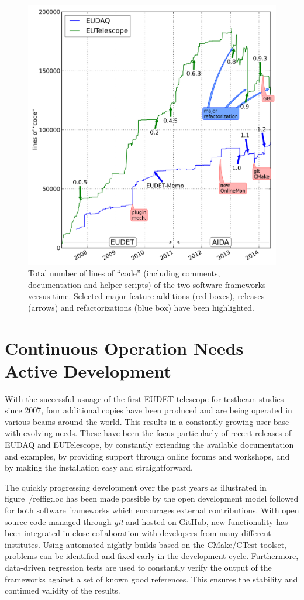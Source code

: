 \documentclass[paper=a4, fontsize=11pt, titlepage]{scrartcl}	%
\numberwithin{equation}{section}		%
\numberwithin{figure}{section}			%
\numberwithin{table}{section}           	%
\begin{document}
  \begin{figure}[htb]
     \centering
     \includegraphics[width=.65\linewidth]{images/loc.png}
     \caption{Total number of lines of ``code'' (including comments,
       documentation and helper scripts) of the two software
       frameworks versus time. Selected major feature additions (red boxes),
       releases (arrows) and refactorizations (blue box) have been highlighted.}
     \label{fig:loc}
   \end{figure}

\section{Continuous Operation Needs Active Development}
With the successful usuage of the first EUDET telescope for testbeam studies since
2007, four additional copies have been produced and are being operated in
various beams around the world. This results in a constantly growing user base
with evolving needs.
These have been the focus particularly of recent releases of EUDAQ and
EUTelescope, by constantly extending the available documentation and
examples, by providing support through online forums and
workshops, and by making the installation easy and straightforward.

The quickly progressing development over the past years as illustrated
in figure~/ref{fig:loc} has been made
possible by the open development model followed for both software
frameworks which encourages external contributions. With open source
code managed through \emph{git} and hosted on GitHub, new functionality has
been integrated in close collaboration with developers from many different
institutes. Using automated nightly builds based on the CMake/CTest toolset, problems can be
identified and fixed early in the development cycle. Furthermore, data-driven regression
tests are used to constantly verify the output of the frameworks
against a set of known good references. This ensures the stability and
continued validity of the results.
\end{document}

